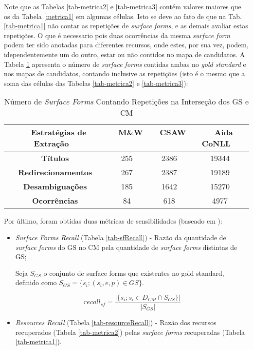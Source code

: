 \documentclass[10pt,a4paper]{llncs}
\begin{document}
{Note que as Tabelas \ref{tab-metrica2} e \ref{tab-metrica3} contém valores maiores que os da Tabela \ref{metrica1} em algumas células. Isto se deve ao fato de que na Tab. \ref{tab-metrica1} não contar as repetições de \textit{surface forms}, e as demais avaliar estas repetições. O que é necessario pois duas ocorrências da mesma \textit{surface form} podem ter sido anotadas para diferentes recursos, onde estes, por sua vez, podem, idependentemente um do outro, estar ou não contidos no mapa de candidatos. A Tabela \ref{tab-sum-metrica2e3} apresenta o número de \textit{surface forms} contidas ambas no \textit{gold standard} e nos mapas de candidatos, contando inclusive as repetições (isto é o mesmo que a soma das células das Tabelas \ref{tab-metrica2} e \ref{tab-metrica3}):
\begin{table} \label{tab-sum-metrica2e3}
\caption{Número de \textit{Surface Forms} Contando Repetições na Interseção dos GS e CM}
\centering
    \begin{tabular}{|c|c|c|c|}
    \hline
    ~ {\bf Estratégias de Extração} ~ 	& ~ {\bf M\&W} ~ 	& ~ {\bf CSAW} ~ 	& ~ {\bf Aida CoNLL} ~\\ \hline  
    {\bf Títulos} 			& 255			& 2386			& 19344 \\ \hline
    {\bf Redirecionamentos} 		& 267			& 2387			& 19189 \\ \hline
    {\bf Desambiguações} 		& 185			& 1642			& 15270 \\ \hline
    {\bf Ocorrências} 			& 84			& 618			& 4977 \\ \hline
    \end{tabular}
\end{table}

Por último, foram obtidas duas métricas de sensibilidades (baseado em \cite{citet-Hachey2012}):
\begin{itemize}
 \item \textit{Surface Forms Recall} (Tabela \ref{tab-sfRecall}) - Razão da quantidade de \textit{surface forms} do GS no CM pela quantidade de \textit{surface forms} distintas de GS;

Seja $S_{GS}$ o conjunto de surface forms que existentes no gold standard, definido como $S_{GS} = \{s_i;  (s_i, e, p)  \in GS \}$.

\[   recall_{sf} = \frac{| \{ s_i ; s_i \in D_{CM} \cap S_{GS} \} |}{ |S_{GS}|}    \]

 \item \textit{Resources Recall} (Tabela \ref{tab-resourceRecall}) - Razão dos recursos recuperados (Tabela \ref{tab-metrica2}) pelas \textit{surface forms} recuperadas (Tabela \ref{tab-metrica1}).



\end{itemize}}
\end{document}
